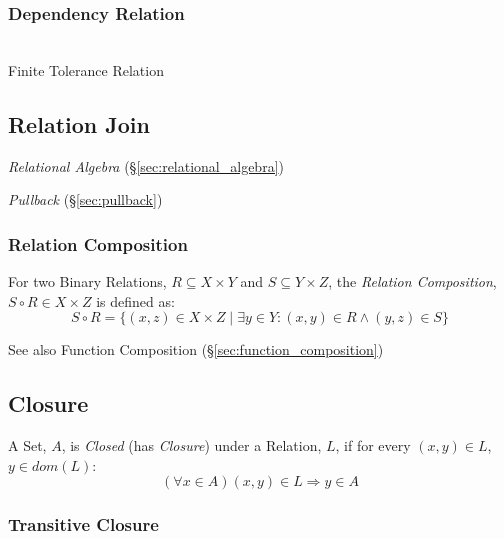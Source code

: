 \subsubsection{Dependency Relation}\label{sec:dependency_relation}
\hfill \\

Finite Tolerance Relation



\subsection{Relation Join}\label{sec:relation_join}

\emph{Relational Algebra} (\S\ref{sec:relational_algebra})

\emph{Pullback} (\S\ref{sec:pullback})



\subsubsection{Relation Composition}\label{sec:relation_composition}

For two Binary Relations, $R \subseteq X \times Y$ and $S \subseteq Y
\times Z$, the \emph{Relation Composition}, $S \circ R \in X \times Z$
is defined as:
\[
  S \circ R = \{(x,z) \in X \times Z \;|\;
  \exists y \in Y : (x,y) \in R \wedge (y,z) \in S \}
\]

See also Function Composition (\S\ref{sec:function_composition})



\subsection{Closure}\label{sec:set_closure}

A Set, $A$, is \emph{Closed} (has \emph{Closure}) under a Relation,
$L$, if for every $(x,y) \in L$, $y \in dom(L)$:
\[
  (\forall x \in A) (x,y) \in L \Rightarrow y \in A
\]



\subsubsection{Transitive Closure}\label{sec:transitive_closure}

